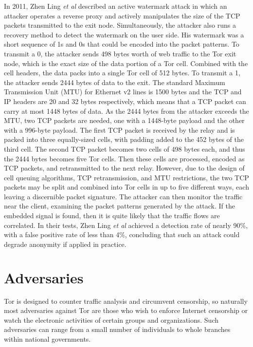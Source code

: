 \documentclass[journal]{IEEEtran}
\begin{document}
In 2011, Zhen Ling \textit{et al} described an active watermark attack in which an attacker operates a reverse proxy and actively manipulates the size of the TCP packets transmitted to the exit node. Simultaneously, the attacker also runs a recovery method to detect the watermark on the user side. His watermark was a short sequence of 1s and 0s that could be encoded into the packet patterns. To transmit a 0, the attacker sends 498 bytes worth of web traffic to the Tor exit node, which is the exact size of the data portion of a Tor cell. Combined with the cell headers, the data packs into a single Tor cell of 512 bytes. To transmit a 1, the attacker sends 2444 bytes of data to the exit. The standard Maximum Transmission Unit (MTU) for Ethernet v2 lines is 1500 bytes and the TCP and IP headers are 20 and 32 bytes respectively, which means that a TCP packet can carry at most 1448 bytes of data. As the 2444 bytes from the attacker exceeds the MTU, two TCP packets are needed, one with a 1448-byte payload and the other with a 996-byte payload. The first TCP packet is received by the relay and is packed into three equally-sized cells, with padding added to the 452 bytes of the third cell. The second TCP packet becomes two cells of 498 bytes each, and thus the 2444 bytes becomes five Tor cells. Then these cells are processed, encoded as TCP packets, and retransmitted to the next relay. However, due to the design of cell queuing algorithms, TCP retransmission, and MTU restrictions, the two TCP packets may be split and combined into Tor cells in up to five different ways, each leaving a discernible packet signature. The attacker can then monitor the traffic near the client, examining the packet patterns generated by the attack. If the embedded signal is found, then it is quite likely that the traffic flows are correlated. In their tests, Zhen Ling \textit{et al} achieved a detection rate of nearly 90\%, with a false positive rate of less than 4\%, concluding that such an attack could degrade anonymity if applied in practice.\cite{Ling2011}



\section{Adversaries}

Tor is designed to counter traffic analysis and circumvent censorship, so naturally most adversaries against Tor are those who wish to enforce Internet censorship or watch the electronic activities of certain groups and organizations. Such adversaries can range from a small number of individuals to whole branches within national governments.
\end{document}
